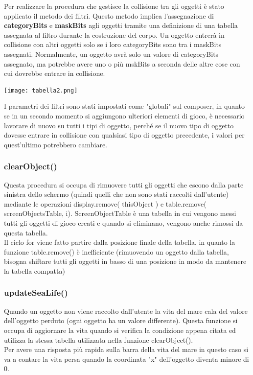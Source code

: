 \documentclass[15pt]{article}
\begin{document}
Per realizzare la procedura che gestisce la collisione tra gli oggetti è stato applicato il metodo dei filtri. 
Questo metodo implica l'assegnazione di \textbf{categoryBits} e \textbf{maskBits} agli oggetti tramite una definizione di una 
tabella assegnata al filtro durante la costruzione del corpo. Un oggetto entrerà in collisione con altri oggetti solo se i loro 
categoryBits sono tra i maskBits assegnati. Normalmente, un oggetto avrà solo un valore di categoryBits assegnato, ma potrebbe avere 
uno o più mskBits a seconda delle altre cose con cui dovrebbe entrare in collisione.

\begin{center}
    \texttt{[image: tabella2.png]}\\
\end{center}

I parametri dei filtri sono stati impostati come "globali" sul composer, in quanto se in un secondo momento si aggiungono ulteriori 
elementi di gioco, è necessario lavorare di nuovo su tutti i tipi di oggetto, perché se il nuovo tipo di oggetto dovesse entrare in 
collisione con qualsiasi tipo di oggetto precedente, i valori per quest'ultimo potrebbero cambiare. 


\subsubsection{clearObject()}
Questa procedura si occupa di rimuovere tutti gli oggetti che escono dalla parte sinistra dello schermo (quindi quelli che non sono stati raccolti dall'utente) mediante le operazioni display.remove( thisObject ) e table.remove( screenObjectsTable, i). ScreenObjectTable è una tabella in cui vengono messi tutti gli oggetti di gioco creati e quando si eliminano, vengono anche rimossi da questa tabella. \\
Il ciclo for viene fatto partire dalla posizione finale della tabella, in quanto la funzione table.remove() è inefficiente (rimuovendo un oggetto dalla tabella, bisogna shiftare tutti gli oggetti in basso di una posizione in modo da mantenere la tabella compatta)

\subsubsection{updateSeaLife()}
Quando un oggetto non viene raccolto dall'utente la vita del mare cala del valore dell'oggetto perduto (ogni oggetto ha un valore differente). Questa funzione si occupa di aggiornare la vita quando si verifica la condizione appena citata ed utilizza la stessa tabella utilizzata nella funzione clearObject().\\
Per avere una risposta più rapida sulla barra della vita del mare in questo caso si va a contare la vita persa quando la coordinata "x" dell'oggetto diventa minore di 0.\\
\end{document}
